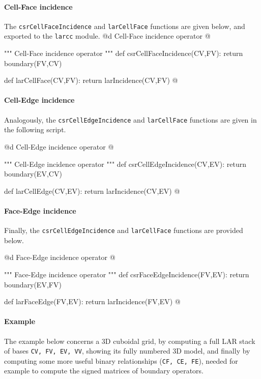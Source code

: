 \documentclass[11pt,oneside]{article}	%
\begin{document}
\paragraph{Cell-Face incidence}
The \texttt{csrCellFaceIncidence} and \texttt{larCellFace} functions are given below, and exported to the \texttt{larcc} module.
@d Cell-Face incidence operator
@{""" Cell-Face incidence operator """
def csrCellFaceIncidence(CV,FV):
	return boundary(FV,CV)

def larCellFace(CV,FV):
	return larIncidence(CV,FV)
@}

\paragraph{Cell-Edge incidence}
Analogously, the \texttt{csrCellEdgeIncidence} and \texttt{larCellFace} functions are given in the following script.

@d Cell-Edge incidence operator
@{""" Cell-Edge incidence operator """
def csrCellEdgeIncidence(CV,EV):
	 return boundary(EV,CV)

def larCellEdge(CV,EV):
	return larIncidence(CV,EV)
@}

\paragraph{Face-Edge incidence}
Finally, the \texttt{csrCellEdgeIncidence} and \texttt{larCellFace} functions are provided below.

@d Face-Edge incidence operator
@{""" Face-Edge incidence operator """
def csrFaceEdgeIncidence(FV,EV):
	return boundary(EV,FV)

def larFaceEdge(FV,EV):
	return larIncidence(FV,EV)
@}


\paragraph{Example}
The example below concerns a 3D cuboidal grid, by computing a full LAR stack of bases
\texttt{CV, FV, EV, VV}, showing its fully numbered 3D model, and finally by computing
some more useful binary relationships (\texttt{CF, CE, FE}), needed for example to compute the signed matrices of boundary operators.
\end{document}
